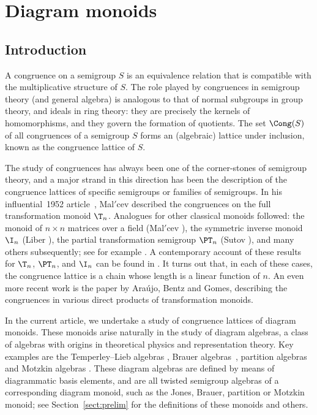 \chapter{Diagram monoids}
\label{chap:motzkin}

\section{Introduction}\label{sec:intro}
A {congruence} on a semigroup $S$ is an equivalence relation that is
compatible with the multiplicative structure of $S$.  The role played by
congruences in semigroup theory (and general algebra) is analogous to that of
normal subgroups in group theory, and ideals in ring theory: they are precisely the kernels of
homomorphisms, and they govern the formation of quotients.  The set $\Cong(S)$
of all congruences of a semigroup $S$ forms an (algebraic) lattice under
inclusion, known as the {congruence lattice} of $S$.

The study of
congruences has always been one of the corner-stones of semigroup theory, and a
major strand in this direction has been the description of the congruence
lattices of specific semigroups or families of semigroups.
%
In his influential~1952 article~\cite{Malcev1952}, Mal$'$cev described the
congruences on the full transformation  monoid $\T_n$.  Analogues for other
classical monoids followed: the monoid of $n\times n$ matrices over a
field (Mal$'$cev \cite{Malcev1953}), the symmetric inverse monoid $\I_n$ (Liber
\cite{Liber1953}), the partial transformation semigroup $\PT_n$ (Sutov \cite{Sutov1961}), and many
others subsequently; see for example \cite{Aizenstat1962,Fernandes2001,MSS2000,Sutov1961_2}.
%
A contemporary account of these results for $\T_n$, $\PT_n$,
and $\I_n$ can be found in \cite[Section 6.3]{GMbook}.  It turns out that,
in each of these cases, the congruence lattice is a chain whose length is a
linear function of $n$.  An even more recent work is the paper
\cite{ABG2016} by Ara\'{u}jo, Bentz and Gomes, describing the congruences in
various direct products of transformation monoids.

In the current article, we undertake a study of congruence lattices of
{diagram monoids}.  These monoids arise naturally in the study of
{diagram algebras}, a class of algebras with origins in theoretical
physics and representation theory. Key examples are the
{Temperley--Lieb algebras} \cite{TL1971,Martin1994,BDP2002},
{Brauer algebras}~\cite{Brauer1937,MarMaz2014},
{partition algebras} \cite{Martin1994,Jones1994_2,HR2005}
and {Motzkin algebras} \cite{BH2014}.
These diagram algebras are defined by means of diagrammatic basis elements, and
are all {twisted semigroup algebras} \cite{Wilcox2007} of a corresponding
diagram monoid, such as the {Jones},
{Brauer}, {partition} or {Motzkin monoid}; see
Section~\ref{sect:prelim} for the definitions of these monoids and others.

